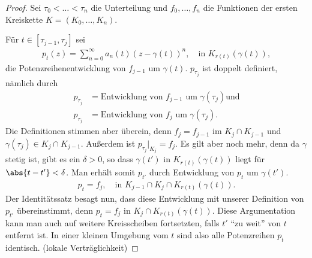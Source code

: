 \begin{proof}
Sei $\tau_0<\ldots<\tau_n$ die Unterteilung und $f_0,\ldots,f_n$ die Funktionen
der ersten Kreiskette $K=(K_0,\ldots,K_n)$.

Für $t\in[\tau_{j-1},\tau_j]$ sei
\begin{align*}
p_t(z) = \sum\limits_{n=0}^\infty a_n(t) (z-\gamma(t))^n,\quad\text{in }
K_{r(t)}(\gamma(t)),
\end{align*}
die Potenzreihenentwicklung von $f_{j-1}$ um $\gamma(t)$.
% 
% 
% 
% 
$p_{\tau_j}$ ist doppelt definiert, nämlich durch
\begin{align*}
p_{\tau_j} &= \text{Entwicklung von }f_{j-1}\text{ um }\gamma(\tau_j)\text{
und}\\
p_{\tau_j} &= \text{Entwicklung von }f_{j}\text{ um }\gamma(\tau_j).
\end{align*}
Die Definitionen stimmen aber überein, denn $f_j = f_{j-1}$ im $K_j\cap
K_{j-1}$ und $\gamma(\tau_j)\in K_j\cap K_{j-1}$. Außerdem ist
$p_{\tau_j}\big|_{K_j} = f_j$. Es gilt aber noch mehr, denn da $\gamma$ stetig
ist, gibt es ein $\delta > 0$, so dass $\gamma(t')$ in $K_{r(t)}(\gamma(t))$
liegt für $\abs{t-t'}<\delta$.
Man erhält somit $p_{t'}$ durch Entwicklung von $p_t$ um
$\gamma(t')$.
\begin{align*}
p_t = f_{j},\quad\text{in } K_{j-1}\cap K_j \cap K_{r(t)}(\gamma(t)).
\end{align*}
Der Identitätssatz besagt nun, dass diese Entwicklung mit unserer Definition
von $p_{t'}$ übereinstimmt, denn $p_t = f_j$ in $K_j\cap
K_{r(t)}(\gamma(t))$. Diese Argumentation kann man auch auf weitere
Kreisscheiben fortsetzten, falls $t'$ ``zu weit'' von $t$ entfernt ist. In
einer kleinen Umgebung vom $t$ sind also alle Potenzreihen $p_t$ identisch.
(lokale Verträglichkeit)
% 


\end{proof}
